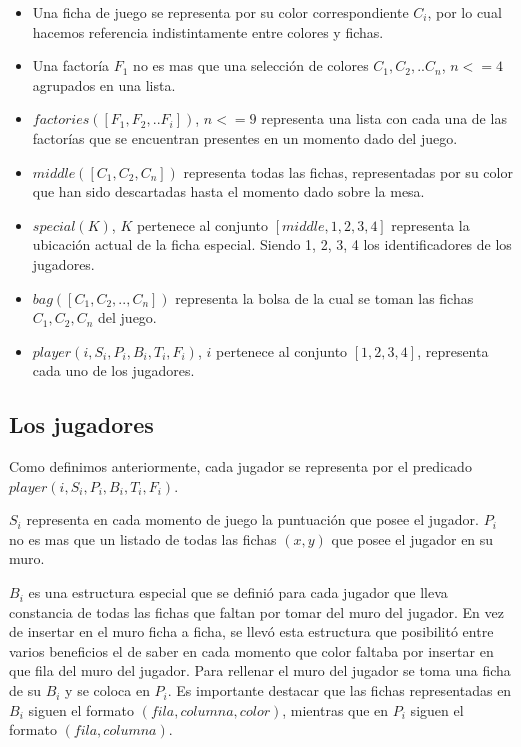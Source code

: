 \documentclass[a4paper,10pt,twocolumn]{article}
\begin{document}
	\begin{itemize}
		\item Una ficha de juego se representa por su color correspondiente $C_i$, por lo cual hacemos referencia indistintamente entre colores y fichas.
		\item Una factoría $F_1$ no es mas que una selección de colores $C_1, C_2, .. C_n$, $n <= 4$ agrupados en una lista.
		\item $factories([F_1, F_2, .. F_i])$, $n <= 9$ representa una lista con cada una de las factorías que se encuentran presentes en un momento dado del juego.
		\item $middle([C_1, C_2, C_n])$ representa todas las fichas, representadas por su color que han sido descartadas hasta el momento dado sobre la mesa.
		\item $special(K)$, $K$ pertenece al conjunto $[middle, 1, 2, 3, 4]$ representa la ubicación actual de la ficha especial. Siendo 1, 2, 3, 4 los identificadores de los jugadores.
		\item $bag([C_1, C_2, .., C_n])$ representa la bolsa de la cual se toman las fichas $C_1, C_2, C_n$ del juego.
		\item $player(i, S_i, P_i, B_i, T_i, F_i)$, $i$ pertenece al conjunto $[1,2,3,4]$, representa cada uno de los jugadores.
	\end{itemize} 

	\subsection{Los jugadores}
	Como definimos anteriormente, cada jugador se representa por el predicado $player(i, S_i, P_i, B_i, T_i, F_i)$.
	
	$S_i$ representa en cada momento de juego la puntuación que posee el jugador. $P_i$ no es mas que un listado de todas las fichas $(x,y)$ que posee el jugador en su muro. 
	
	$B_i$ es una estructura especial que se definió para cada jugador que lleva constancia de todas las fichas que faltan por tomar del muro del jugador. En vez de insertar en el muro ficha a ficha, se llevó esta estructura que posibilitó entre varios beneficios el de saber en cada momento que color faltaba por insertar en que fila del muro del jugador. Para rellenar el muro del jugador se toma una ficha de su $B_i$ y se coloca en $P_i$. Es importante destacar que las fichas representadas en $B_i$ siguen el formato $(fila, columna, color)$, mientras que en $P_i$ siguen el formato $(fila, columna)$.
	
\end{document}
